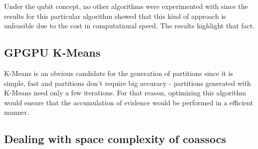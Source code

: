Under the qubit concept, no other algorithms were experimented with since the results for this particular algorithm showed that this kind of approach is unfeasible due to the cost in computational speed. The results highlight that fact.




\subsection{GPGPU K-Means}
K-Means is an obvious candidate for the generation of partitions since it is simple, fast and partitions don't require big accuracy - partitions generated with K-Means need only a few iterations. For that reason, optimizing this algorithm would ensure that the accumulation of evidence would be performed in a efficient manner.



\subsection{Dealing with space complexity of coassocs}



